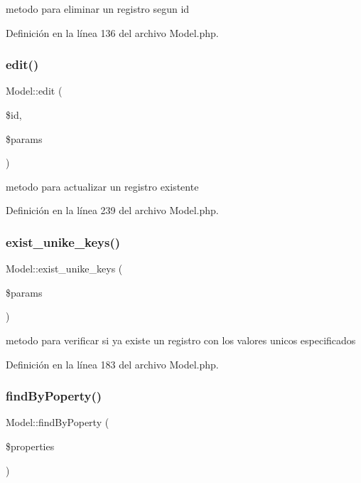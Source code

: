 metodo para eliminar un registro segun id 

Definición en la línea 136 del archivo Model.\+php.

\mbox{\label{class_model_adae5eb27d36ae799ef4fa23dec88d302}} 
\subsubsection{\texorpdfstring{edit()}{edit()}}
{\footnotesize\ttfamily Model\+::edit (\begin{DoxyParamCaption}\item[{}]{\$id,  }\item[{}]{\$params }\end{DoxyParamCaption})}

metodo para actualizar un registro existente 

Definición en la línea 239 del archivo Model.\+php.

\mbox{\label{class_model_afbf5f640ebb15823608a233cc3f2e8f5}} 
\subsubsection{\texorpdfstring{exist\_unike\_keys()}{exist\_unike\_keys()}}
{\footnotesize\ttfamily Model\+::exist\+\_\+unike\+\_\+keys (\begin{DoxyParamCaption}\item[{}]{\$params }\end{DoxyParamCaption})}

metodo para verificar si ya existe un registro con los valores unicos especificados 

Definición en la línea 183 del archivo Model.\+php.

\mbox{\label{class_model_a067c962b5ac1b38809aba6c8b7af46b1}} 
\subsubsection{\texorpdfstring{findByPoperty()}{findByPoperty()}}
{\footnotesize\ttfamily Model\+::find\+By\+Poperty (\begin{DoxyParamCaption}\item[{}]{\$properties }\end{DoxyParamCaption})}

